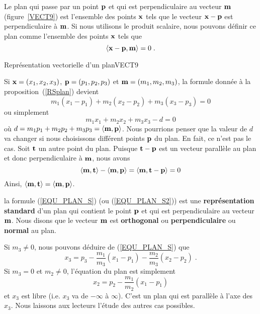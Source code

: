 {\begin{prop} \label{RSplan}
Le plan qui passe par un point $\mathbf{p}$ et qui est perpendiculaire au
vecteur $\mathbf{m}$ (figure~\ref{VECT9}) est l'ensemble des
points $\mathbf{x}$ tels que le vecteur $\displaystyle \mathbf{x}-\mathbf{p}$ est
perpendiculaire à $\mathbf{m}$.  Si nous utilisons le produit scalaire, nous
pouvons définir ce plan comme l'ensemble des points $\mathbf{x}$ tels que
\[
\left\langle{\mathbf{x}-\mathbf{p}} , {\mathbf{m}}\right\rangle = 0 \; .
\]
\end{prop}

{Représentation vectorielle d'un plan}{VECT9}

Si $\displaystyle \mathbf{x}=(x_1,x_2,x_3)$, $\displaystyle \mathbf{p}=(p_1,p_2,p_3)$
et $\displaystyle \mathbf{m} = (m_1,m_2,m_3)$, la formule donnée à la
proposition~(\ref{RSplan}) devient
\begin{equation} \label{EQU_PLAN_S}
m_1 (x_1-p_1) + m_2 (x_2-p_2) + m_3 (x_3-p_3) = 0
\end{equation}
ou simplement
\begin{equation} \label{EQU_PLAN_S2}
m_1 x_1 + m_2 x_2 + m_3 x_3 - d = 0
\end{equation}
où $d = m_1 p_1 + m_2 p_2 + m_3 p_3 = \left\langle{\mathbf{m}} , {\mathbf{p}}\right\rangle$.  Nous
pourrions penser que la valeur de $d$ va changer si nous choisissons
différent points $\mathbf{p}$ du plan.  En fait, ce n'est pas le cas.
Soit $\mathbf{t}$ un autre point du plan.  Puisque
$\mathbf{t} - \mathbf{p}$ est un vecteur parallèle au plan et donc
perpendiculaire à $\mathbf{m}$, nous avons
\[
\left\langle{\mathbf{m}} , {\mathbf{t}}\right\rangle - \left\langle{\mathbf{m}} , {\mathbf{p}}\right\rangle 
= \left\langle{\mathbf{m}} , {\mathbf{t} - \mathbf{p}}\right\rangle = 0
\]
Ainsi, $\left\langle{\mathbf{m}} , {\mathbf{t}}\right\rangle = \left\langle{\mathbf{m}} , {\mathbf{p}}\right\rangle$.

\begin{defn}
la formule (\ref{EQU_PLAN_S}) (ou (\ref{EQU_PLAN_S2})\;) est une
{\bfseries représentation standard} d'un plan qui contient le point $\mathbf{p}$ et qui est
perpendiculaire au vecteur $\mathbf{m}$.  Nous disons que le vecteur $\mathbf{m}$
est {\bfseries orthogonal} ou {\bfseries perpendiculaire}
ou {\bfseries normal} au plan.
\end{defn}

Si $m_3 \neq 0$, nous pouvons déduire de (\ref{EQU_PLAN_S}) que
\[
x_3 = p_3 - \frac{m_1}{m_3} (x_1-p_1) - \frac{m_2}{m_3} (x_2- p_2) \;.
\]
Si $m_3 = 0$ et $m_2 \neq 0$, l'équation du plan est simplement
\[
x_2 = p_2 - \frac{m_1}{m_2} (x_1- p_1)
\]
et $x_3$ est libre (i.e. $x_3$ va de $-\infty$ à $\infty$).
C'est un plan qui est parallèle à l'axe des $x_3$.  Nous laissons aux lecteurs
l'étude des autres cas possibles.

}
